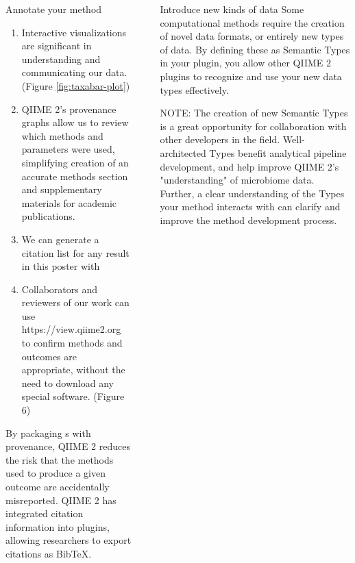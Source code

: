 \documentclass[final]{beamer}
\newlength{\sepwidth}
\newlength{\colwidth}
\newcommand{\separatorcolumn}{\begin{column}{\sepwidth}\end{column}}
\begin{document}
\begin{frame}[t]
\begin{columns}[t]
\begin{column}{\colwidth}
\begin{block}{Annotate your method}
    \begin{enumerate}
      \item Interactive visualizations are significant in understanding and
      communicating our data. (Figure \ref{fig:taxabar-plot})
      \item QIIME 2's provenance graphs allow us to review which methods and
      parameters were used, simplifying creation of an accurate methods section
      and supplementary materials for academic publications.
      \item We can generate a citation list for any result in this poster with 
      \item Collaborators and reviewers of our work can use https://view.qiime2.org to confirm methods and outcomes are
      appropriate, without the need to download any special software. (Figure 6)
    \end{enumerate}

  \begin{tcolorbox}
  [width=\textwidth, colframe=blue]
  {By packaging s with provenance, QIIME 2 reduces the risk that the
  methods used to produce a given outcome are accidentally misreported.
  QIIME 2 has integrated citation information into plugins, allowing
  researchers to export citations as BibTeX}.
  \end{tcolorbox}

\end{block}

\end{column}

\separatorcolumn

\begin{column}{\colwidth}

  \begin{block}{Introduce new kinds of data}
    Some computational methods require the creation of novel data formats, or
    entirely new types of data. By defining these as Semantic Types in your plugin,
    you allow other QIIME 2 plugins to recognize and use your new data types effectively.

    \begin{tcolorbox}
    [width=\textwidth, colframe=blue]
    {NOTE: The creation of new Semantic Types is a great opportunity for collaboration
    with other developers in the field. Well-architected Types benefit analytical pipeline
    development, and help improve QIIME 2's "understanding" of microbiome data. Further,
    a clear understanding of the Types your method interacts with can clarify and improve the method
    development process.}
    \end{tcolorbox}
  \end{block}


\end{column}
\end{columns}
\end{frame}
\end{document}
